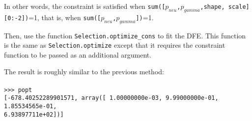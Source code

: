 \documentclass[11pt]{article}
\begin{document}


In other words, the constraint is satisfied when \texttt{sum([$p_{neu}$,$p_{gamma}$,shape, scale][0:-2])}=1, that is, when \texttt{sum([$p_{neu}$,$p_{gamma}$])}=1.

Then, use the function \texttt{Selection.optimize\_cons} to fit the DFE. This function is the same as \texttt{Selection.optimize} except that it requires the constraint function to be passed as an additional argument.



The result is roughly similar to the previous method: \\ \\
\texttt{>>> popt} \\
\texttt{[-678.40252289901571, array([  1.00000000e-03,   9.99000000e-01,   1.85534565e-01,} \\
\texttt{6.93897711e+02])]}

{}

\end{document}
